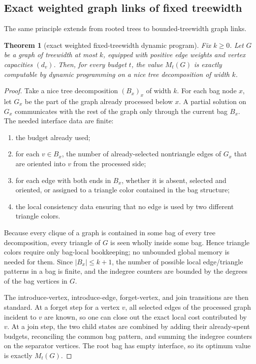 \documentclass[11pt]{article}
\newtheorem{theorem}{Theorem}[section]
\theoremstyle{definition}
\begin{document}
\subsection{Exact weighted graph links of fixed treewidth}
The same principle extends from rooted trees to bounded-treewidth graph links.

\begin{theorem}[exact weighted fixed-treewidth dynamic program]\label{thm:treewidth-dp}
Fix \(k\ge 0\). Let \(G\) be a graph of treewidth at most \(k\), equipped with positive edge weights and vertex capacities \((d_v)\). Then, for every budget \(t\), the value \(M_t(G)\) is exactly computable by dynamic programming on a nice tree decomposition of width \(k\).
\end{theorem}

\begin{proof}
Take a nice tree decomposition \((B_x)_x\) of width \(k\). For each bag node \(x\), let \(G_x\) be the part of the graph already processed below \(x\). A partial solution on \(G_x\) communicates with the rest of the graph only through the current bag \(B_x\). The needed interface data are finite:
\begin{enumerate}[label=(\roman*)]
    \item the budget already used;
    \item for each \(v\in B_x\), the number of already-selected nontriangle edges of \(G_x\) that are oriented into \(v\) from the processed side;
    \item for each edge with both ends in \(B_x\), whether it is absent, selected and oriented, or assigned to a triangle color contained in the bag structure;
    \item the local consistency data ensuring that no edge is used by two different triangle colors.
\end{enumerate}
Because every clique of a graph is contained in some bag of every tree decomposition, every triangle of \(G\) is seen wholly inside some bag. Hence triangle colors require only bag-local bookkeeping; no unbounded global memory is needed for them. Since \(|B_x|\le k+1\), the number of possible local edge/triangle patterns in a bag is finite, and the indegree counters are bounded by the degrees of the bag vertices in \(G\).

The introduce-vertex, introduce-edge, forget-vertex, and join transitions are then standard. At a forget step for a vertex \(v\), all selected edges of the processed graph incident to \(v\) are known, so one can close out the exact local cost contributed by \(v\). At a join step, the two child states are combined by adding their already-spent budgets, reconciling the common bag pattern, and summing the indegree counters on the separator vertices. The root bag has empty interface, so its optimum value is exactly \(M_t(G)\).
\end{proof}
\end{document}
